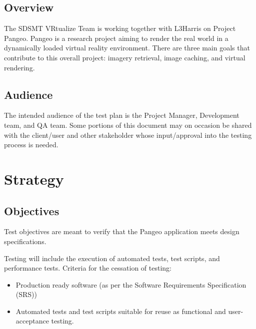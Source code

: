 \documentclass[letterpaper,10pt,english,openany,oneside]{sphinxmanual}
\begin{document}
\subsection{Overview}
\label{\detokenize{test_plan/intro:overview}}
The SDSMT VRtualize Team is working together with L3Harris on Project Pangeo. Pangeo is a research project aiming to render the real world in a dynamically loaded virtual reality environment. There are three main goals that contribute to this overall project: imagery retrieval, image caching, and virtual rendering.


\subsection{Audience}
\label{\detokenize{test_plan/intro:audience}}
The intended audience of the test plan is the Project Manager, Development team, and QA team. Some portions of this document may on occasion be shared with the client/user and other stakeholder whose input/approval into the testing process is needed.


\section{Strategy}
\label{\detokenize{test_plan/strategy:strategy}}\label{\detokenize{test_plan/strategy:id1}}\label{\detokenize{test_plan/strategy::doc}}

\subsection{Objectives}
\label{\detokenize{test_plan/strategy:objectives}}
Test objectives are meant to verify that the Pangeo application meets design specifications.

Testing will include the execution of automated tests, test scripts, and performance tests.
Criteria for the cessation of testing:
\begin{itemize}
\item {} 
Production ready  software (as per the Software Requirements Specification (SRS))

\item {} 
Automated tests and test scripts suitable for reuse as functional and user-acceptance testing.

\end{itemize}
\end{document}
